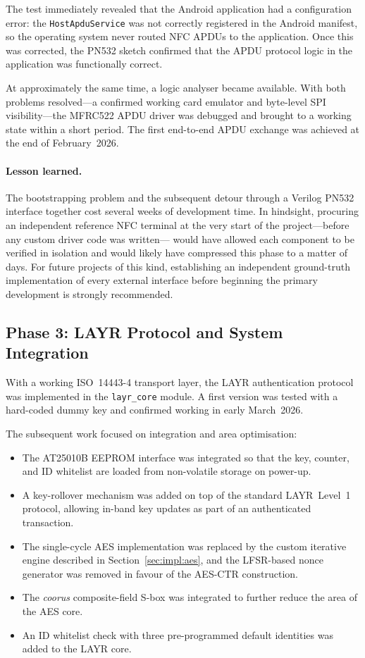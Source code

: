 \documentclass[manuscript,screen,nonacm]{acmart}
\begin{document}
The test immediately revealed that the Android application had a
configuration error: the \texttt{HostApduService} was not correctly
registered in the Android manifest, so the operating system never
routed NFC APDUs to the application.
Once this was corrected, the PN532 sketch confirmed that the APDU
protocol logic in the application was functionally correct.

At approximately the same time, a logic analyser became available.
With both problems resolved—a confirmed working card emulator and
byte-level SPI visibility—the MFRC522 APDU driver was debugged and
brought to a working state within a short period.
The first end-to-end APDU exchange was achieved at the end of February~2026.

\paragraph{Lesson learned.}
The bootstrapping problem and the subsequent detour through a Verilog
PN532 interface together cost several weeks of development time.
In hindsight, procuring an independent reference NFC terminal at the
very start of the project—before any custom driver code was written—
would have allowed each component to be verified in isolation and
would likely have compressed this phase to a matter of days.
For future projects of this kind, establishing an independent
ground-truth implementation of every external interface before
beginning the primary development is strongly recommended.

\subsection{Phase 3: LAYR Protocol and System Integration}
\label{sec:process:phase3}

With a working ISO~14443-4 transport layer, the LAYR authentication
protocol was implemented in the \texttt{layr\_core} module.
A first version was tested with a hard-coded dummy key and confirmed
working in early March~2026.

The subsequent work focused on integration and area optimisation:
\begin{itemize}
  \item The AT25010B EEPROM interface was integrated so that the key,
        counter, and ID whitelist are loaded from non-volatile storage
        on power-up.
  \item A key-rollover mechanism was added on top of the standard
        LAYR~Level~1 protocol, allowing in-band key updates as part
        of an authenticated transaction.
  \item The single-cycle AES implementation was replaced by the custom
        iterative engine described in Section~\ref{sec:impl:aes},
        and the LFSR-based nonce generator was removed in favour of
        the AES-CTR construction.
  \item The \emph{coorus} composite-field S-box was integrated to
        further reduce the area of the AES core.
  \item An ID whitelist check with three pre-programmed default
        identities was added to the LAYR core.
\end{itemize}
\end{document}
